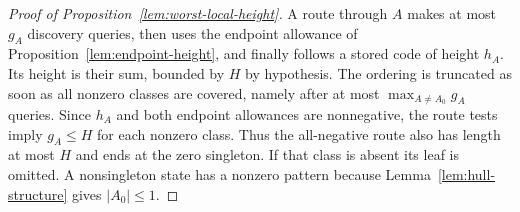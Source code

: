 \begin{proof}[Proof of Proposition~\ref{lem:worst-local-height}]
A route through $A$ makes at most $g_A$ discovery queries,
then uses the endpoint allowance of Proposition~\ref{lem:endpoint-height},
and finally follows a stored
code of height $h_A$. Its height is their sum, bounded by $H$ by
hypothesis. The ordering is truncated as soon as all nonzero classes
are covered, namely after at most $\max_{A\ne A_0}g_A$ queries.
Since $h_A$ and both endpoint allowances are nonnegative, the route
tests imply $g_A\le H$ for each nonzero class. Thus the all-negative
route also has length at most $H$ and ends at the zero singleton. If that class is absent its leaf is
omitted. A nonsingleton state has a nonzero pattern because
Lemma~\ref{lem:hull-structure} gives $|A_0|\le1$.
\end{proof}

